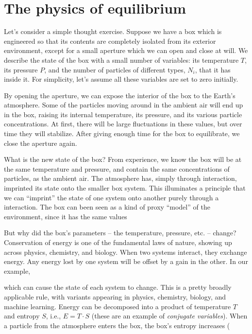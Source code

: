 \documentclass[a4paper]{article}
\begin{document}
\section{The physics of equilibrium}



Let's consider a simple thought exercise. Suppose we have a box which is engineered so that its contents are completely isolated from its exterior environment, except for a small aperture which we can open and close at will. We describe the state of the box with a small number of variables: its temperature $T$, its pressure $P$, and the number of particles of different types, $N_i$, that it has inside it. For simplicity, let's assume all these variables are set to zero initially. 

By opening the aperture, we can expose the interior of the box to the Earth's atmosphere. Some of the particles moving around in the ambient air will end up in the box, raising its internal temperature, its pressure, and its various particle concentrations. At first, there will be large fluctuations in these values, but over time they will stabilize. After giving enough time for the box to equilibrate, we close the aperture again. 

What is the new state of the box? From experience, we know the box will be at the same temperature and pressure, and contain the same concentrations of particles, as the ambient air. The atmosphere has, simply through interaction, imprinted its state onto the smaller box system. 
This illuminates a principle that we can ``imprint'' the state of one system onto another purely through a interaction. The box can been seen as a kind of proxy ``model'' of the environment, since it has the same values 

But why did the box's parameters -- the temperature, pressure, etc. -- change? Conservation of energy is one of the fundamental laws of nature, showing up across physics, chemistry, and biology. When two systems interact, they exchange energy. Any energy lost by one system will be offset by a gain in the other. In our example, 


which can cause the state of each system to change. This is a pretty broadly applicable rule, with variants appearing in physics, chemistry, biology, and machine learning.
Energy can be decomposed into a product of temperature $T$ and entropy $S$, i.e., $E = T\cdot S$ (these are an example of \emph{conjugate variables}). When a particle from the atmosphere enters the box, the box's entropy increases (
\end{document}
